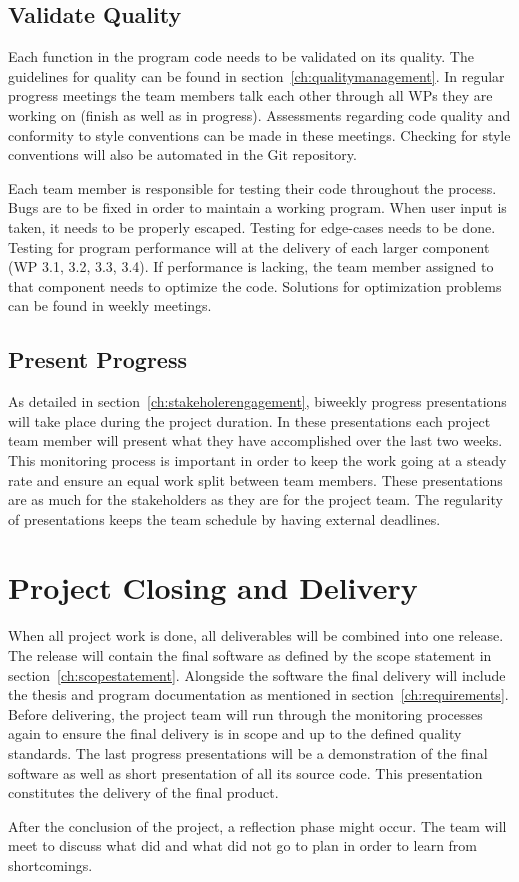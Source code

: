 \subsection{Validate Quality}
\label{ch:validatequality}
Each function in the program code needs to be validated on its quality. The guidelines for quality can be found in section~\ref{ch:qualitymanagement}. In regular progress meetings the team members talk each other through all \ac{WP}s they are working on (finish as well as in progress). Assessments regarding code quality and conformity to style conventions can be made in these meetings. Checking for style conventions will also be automated in the Git repository.

Each team member is responsible for testing their code throughout the process. Bugs are to be fixed in order to maintain a working program. When user input is taken, it needs to be properly escaped. Testing for edge-cases needs to be done. Testing for program performance will at the delivery of each larger component (\ac{WP} 3.1, 3.2, 3.3, 3.4). If performance is lacking, the team member assigned to that component needs to optimize the code. Solutions for optimization problems can be found in weekly meetings.

\subsection{Present Progress}
\label{ch:presentprogress}
As detailed in section~\ref{ch:stakeholerengagement}, biweekly progress presentations will take place during the project duration. In these presentations each project team member will present what they have accomplished over the last two weeks. This monitoring process is important in order to keep the work going at a steady rate and ensure an equal work split between team members. These presentations are as much for the stakeholders as they are for the project team. The regularity of presentations keeps the team schedule by having external deadlines.


\section{Project Closing and Delivery}
\label{ch:projectclosing}
When all project work is done, all deliverables will be combined into one release. The release will contain the final software as defined by the scope statement in section~\ref{ch:scopestatement}. Alongside the software the final delivery will include the thesis and program documentation as mentioned in section~\ref{ch:requirements}. Before delivering, the project team will run through the monitoring processes again to ensure the final delivery is in scope and up to the defined quality standards. The last progress presentations will be a demonstration of the final software as well as short presentation of all its source code. This presentation constitutes the delivery of the final product.

After the conclusion of the project, a reflection phase might occur. The team will meet to discuss what did and what did not go to plan in order to learn from shortcomings.
